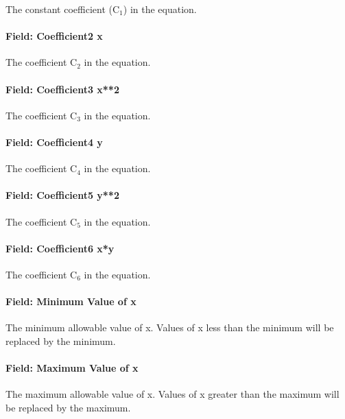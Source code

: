 The constant coefficient (C\(_{1}\)) in the equation.

\paragraph{Field: Coefficient2 x}\label{field-coefficient2-x-5}

The coefficient C\(_{2}\) in the equation.

\paragraph{Field: Coefficient3 x**2}\label{field-coefficient3-x2-4}

The coefficient C\(_{3}\) in the equation.

\paragraph{Field: Coefficient4 y}\label{field-coefficient4-y-2}

The coefficient C\(_{4}\) in the equation.

\paragraph{Field: Coefficient5 y**2}\label{field-coefficient5-y2-1}

The coefficient C\(_{5}\) in the equation.

\paragraph{Field: Coefficient6 x*y}\label{field-coefficient6-xy-1}

The coefficient C\(_{6}\) in the equation.

\paragraph{Field: Minimum Value of x}\label{field-minimum-value-of-x-7}

The minimum allowable value of x. Values of x less than the minimum will be replaced by the minimum.

\paragraph{Field: Maximum Value of x}\label{field-maximum-value-of-x-8}

The maximum allowable value of x. Values of x greater than the maximum will be replaced by the maximum.

